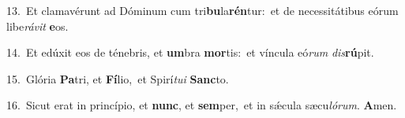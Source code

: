 {\numbfont\textcolor{\numbcolor}{13.}}~Et clamavérunt ad Dóminum cum tri\-\textbf{bu}\-la\-\textbf{rén}\-tur:~\star et de necessitátibus eórum libe\-\textit{rá}\-\textit{vit} \textbf{e}\-os.\par
{\numbfont\textcolor{\numbcolor}{14.}}~Et edúxit eos de ténebris, et \textbf{um}\-bra \textbf{mor}\-tis:~\star et víncula eó\textit{rum} \textit{dis}\-\textbf{rú}pit.\par
{\numbfont\textcolor{\numbcolor}{15.}}~Glória \textbf{Pa}\-tri, et \textbf{Fí}\-lio,~\star et Spirí\-\textit{tu}\-\textit{i} \textbf{Sanc}\-to.\par
{\numbfont\textcolor{\numbcolor}{16.}}~Sicut erat in princípio, et \textbf{nunc}\-, et \textbf{sem}\-per,~\star et in sǽcula sæcu\-\textit{ló}\-\textit{rum}. \textbf{A}\-men.\par
